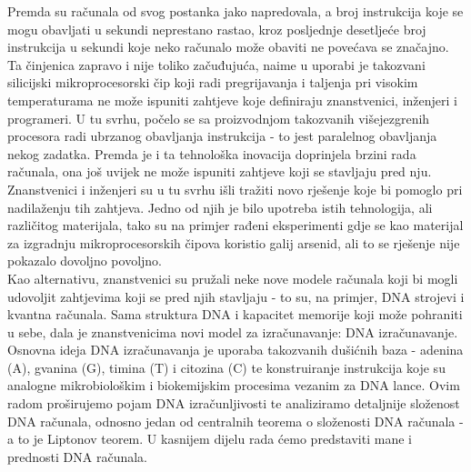 \documentclass[12pt, a4paper]{book}
\begin{document}
\newpage


\begin{spacing}{1.5}
\setcounter{chapter}{1}
\begin{intro}
    \indent Premda su računala od svog postanka jako napredovala, a broj instrukcija koje se mogu obavljati u sekundi neprestano rastao, kroz posljednje desetljeće broj instrukcija u sekundi koje neko računalo može obaviti ne povećava se značajno. Ta činjenica zapravo i nije toliko začuđujuća, naime u uporabi je takozvani silicijski mikroprocesorski čip koji radi pregrijavanja i taljenja pri visokim temperaturama ne može ispuniti zahtjeve koje definiraju znanstvenici, inženjeri i programeri. U tu svrhu, počelo se sa proizvodnjom takozvanih višejezgrenih procesora radi ubrzanog obavljanja instrukcija - to jest paralelnog obavljanja nekog zadatka. Premda je i ta tehnološka inovacija doprinjela brzini rada računala, ona još uvijek ne može ispuniti zahtjeve koji se stavljaju pred nju.\\
    \indent Znanstvenici i inženjeri su u tu svrhu išli tražiti novo rješenje koje bi pomoglo pri nadilaženju tih zahtjeva. Jedno od njih je bilo upotreba istih tehnologija, ali različitog materijala, tako su na primjer rađeni eksperimenti gdje se kao materijal za izgradnju mikroprocesorskih čipova koristio galij arsenid, ali to se rješenje nije pokazalo dovoljno povoljno.\\
    \indent Kao alternativu, znanstvenici su pružali neke nove modele računala koji bi mogli udovoljit zahtjevima koji se pred njih stavljaju - to su, na primjer, DNA strojevi i kvantna računala. Sama struktura DNA i kapacitet memorije koji može pohraniti u sebe, dala je znanstvenicima novi model za izračunavanje: DNA izračunavanje. Osnovna ideja DNA izračunavanja je uporaba takozvanih dušićnih baza - adenina (A), gvanina (G), timina (T) i citozina (C) te konstruiranje instrukcija koje su analogne mikrobiološkim i biokemijskim procesima vezanim za DNA lance. Ovim radom proširujemo pojam DNA izračunljivosti te analiziramo detaljnije složenost DNA računala, odnosno jedan od centralnih teorema o složenosti DNA računala - a to je Liptonov teorem. U kasnijem dijelu rada ćemo predstaviti mane i prednosti DNA računala. 
\end{intro}
\newpage

\end{spacing}
\end{document}
